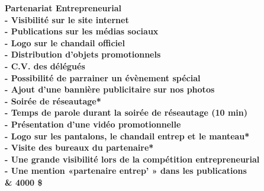 \bf Partenariat Entrepreneurial\\
- Visibilité sur le site internet\\
- Publications sur les médias sociaux\\
- Logo sur le chandail officiel\\
- Distribution d'objets promotionnels\\
- C.V. des délégués\\
- Possibilité de parrainer un évènement spécial\\
- Ajout d'une bannière publicitaire sur nos photos\\
- Soirée de réseautage*\\
- Temps de parole durant la soirée de réseautage (10 min)\\
- Présentation d'une vidéo promotionnelle\\
- Logo sur les pantalons, le chandail entrep et le manteau*\\
- Visite des bureaux du partenaire*\\
- Une grande visibilité lors de la compétition entrepreneurial\\
- Une mention «partenaire entrep' » dans les publications\\
& 4000 \$\\
